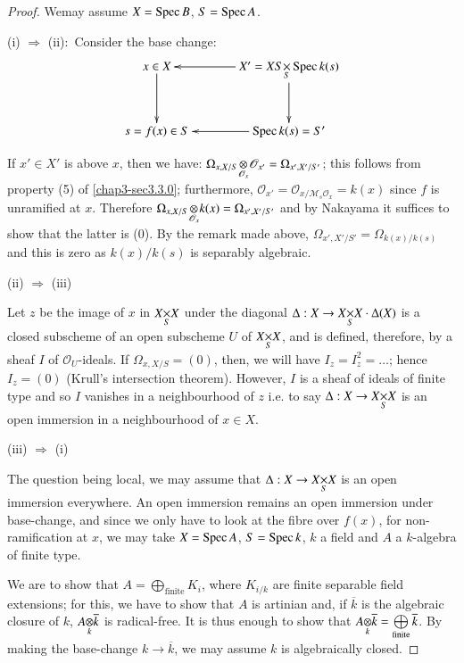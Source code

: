 \begin{proof}
We\pageoriginale may assume $X=\operatorname{Spec} B$, $S=\operatorname{Spec} A$.

\medskip
(i) $\Rightarrow$ (ii):~Consider the base change:
\[
\xymatrix@=1.2cm{
x\in X\ar[d] & X'=X\fprod{S}{\Spec k(s)}{S}\ar@{->}[l]\ar[d]\\
s=f(x)\in S & \Spec k(s)=S'\ar@{->}[l]
}
\]

If $x'\in X'$ is above $x$, then we have:
$\foprod{\Omega_{x,X/S}}{\mathscr{O}_{x'}}{\mathscr{O}_{x}}=\Omega_{x',X'/S'}$;
this follows from property (5) of \ref{chap3-sec3.3.0}; furthermore,%
$\mathscr{O}_{x'}=\mathscr{O}_{x/\mathscr{M}_{s}\mathscr{O}_{x}}=k(x)$
since $f$ is unramified at $x$. Therefore
$\foprod{\Omega_{x,X/S}}{k(x)}{\mathscr{O}_{x}}=\Omega_{x',X'/S'}$ and
by Nakayama it suffices to show that the latter is (0). By the remark
made above, $\Omega_{x',X'/S'}=\Omega_{k(x)/k(s)}$ and this is zero as
$k(x)/k(s)$ is separably algebraic.

\medskip
(ii) $\Rightarrow$ (iii)

Let $z$ be the image of $x$ in $\fprod{X}{X}{S}$ under the diagonal
$\Delta:X\to \fprod{X}{X}{S}\cdot \Delta(X)$ is a closed subscheme of
an open subscheme $U$ of $\fprod{X}{X}{S}$, and is defined, therefore,
by a sheaf $I$ of $\mathscr{O}_{U}$-ideals. If $\Omega_{x,X/S}=(0)$,
then, we will have $I_{z}=I^{2}_{z}=\ldots$; hence\pageoriginale
$I_{z}=(0)$ (Krull's intersection theorem). However, $I$ is a sheaf of
ideals of finite type and so $I$ vanishes in a neighbourhood of $z$
i.e. to say $\Delta:X\to \fprod{X}{X}{S}$ is an open immersion in a
neighbourhood of $x\in X$.

\medskip
(iii) $\Rightarrow$ (i)

The question being local, we may assume that $\Delta:X\to
\fprod{X}{X}{S}$ is an open immersion everywhere. An open immersion
remains an open immersion under base-change, and since we only have to
look at the fibre over $f(x)$, for non-ramification at $x$, we may
take $X=\operatorname{Spec} A$, $S=\operatorname{Spec} k$, $k$ a field and $A$ a $k$-algebra of
finite type.

We are to show that $A=\bigoplus\limits_{\text{finite}}K_{i}$, where
$K_{i/k}$ are finite separable field extensions; for this, we have to
show that $A$ is artinian and, if $\overline{k}$ is the algebraic
closure of $k$, $\foprod{A}{\overline{k}}{k}$ is radical-free. It is
thus enough to show that
$\foprod{A}{\overline{k}}{k}=\bigoplus\limits_{\text{finite}}\overline{k}$. By
making the base-change $k\to \overline{k}$, we may assume $k$ is
algebraically closed.


\end{proof}

